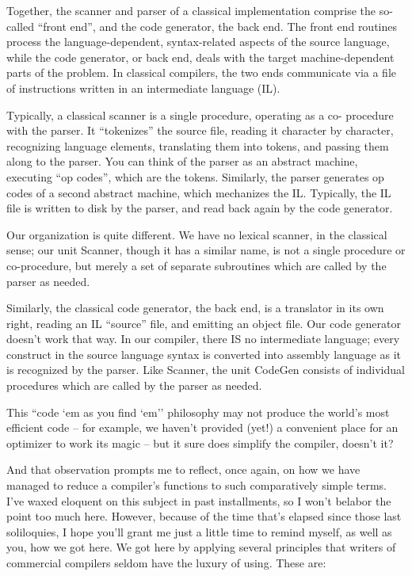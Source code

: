 Together, the scanner and parser of a classical implementation comprise the so-called ``front end'', and the code generator, the back end. The front end routines process the language-dependent, syntax-related aspects of the source language, while the code generator, or back end, deals with the target machine-dependent parts of the problem. In classical compilers, the two ends communicate via a file of instructions written in an intermediate language (IL).

Typically, a classical scanner is a single procedure, operating as a co- procedure with the parser. It ``tokenizes'' the source file, reading it character by character, recognizing language elements, translating them into tokens, and passing them along to the parser. You can think of the parser as an abstract machine, executing ``op codes'', which are the tokens. Similarly, the parser generates op codes of a second abstract machine, which mechanizes the IL. Typically, the IL file is written to disk by the parser, and read back again by the code generator.

Our organization is quite different. We have no lexical scanner, in the classical sense;  our unit Scanner, though it has a similar name, is not a single procedure or co-procedure, but merely a set of separate subroutines which are called by the parser as needed.

Similarly, the classical code generator, the back end, is a translator in its own right, reading an IL ``source'' file, and emitting an object file. Our code generator doesn't work that way. In our compiler, there IS no intermediate language; every construct in the source language syntax is converted into assembly language as it is recognized by the parser. Like Scanner, the unit CodeGen consists of individual procedures which are called by the parser as needed.

This ``code `em as you find `em'' philosophy may not produce the world's most efficient code -- for example, we haven't provided (yet!) a convenient place for an optimizer to work its magic -- but it sure does simplify the compiler, doesn't it?

And that observation prompts me to reflect, once again, on how we have managed to reduce a compiler's functions to such comparatively simple terms. I've waxed eloquent on this subject in past installments, so I won't belabor the point too much here. However, because of the time that's elapsed since those last soliloquies, I hope you'll grant me just a little time to remind myself, as well as you, how we got here. We got here by applying several principles that writers of commercial compilers seldom have the luxury of using. These are:

